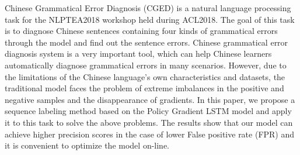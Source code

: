 Chinese Grammatical Error Diagnosis (CGED) is a natural language processing task for the NLPTEA2018 workshop held during ACL2018. The goal of this task is to diagnose Chinese sentences containing four kinds of grammatical errors through the model and find out the sentence errors. Chinese grammatical error diagnosis system is a very important tool, which can help Chinese learners automatically diagnose grammatical errors in many scenarios. However, due to the limitations of the Chinese language's own characteristics and datasets, the traditional model faces the problem of extreme imbalances in the positive and negative samples and the disappearance of gradients. In this paper, we propose a sequence labeling method based on the Policy Gradient LSTM model and apply it to this task to solve the above problems. The results show that our model can achieve higher precision scores in the case of lower False positive rate (FPR) and it is convenient to optimize the model on-line.
